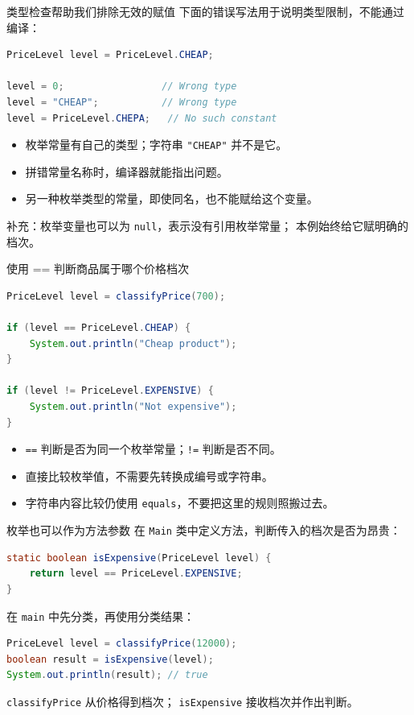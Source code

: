 \documentclass[aspectratio=169]{beamer}
\begin{document}
\begin{frame}[fragile]{类型检查帮助我们排除无效的赋值}
  下面的错误写法用于说明类型限制，\alert{不能通过编译}：
  \begin{lstlisting}[language=Java]
PriceLevel level = PriceLevel.CHEAP;

level = 0;                 // Wrong type
level = "CHEAP";           // Wrong type
level = PriceLevel.CHEPA;   // No such constant
  \end{lstlisting}
  \begin{itemize}
    \item 枚举常量有自己的类型；字符串 \texttt{"CHEAP"} 并不是它。
    \item 拼错常量名称时，编译器就能指出问题。
    \item 另一种枚举类型的常量，即使同名，也不能赋给这个变量。
  \end{itemize}
  \medskip
  补充：枚举变量也可以为 \texttt{null}，表示没有引用枚举常量；
  本例始终给它赋明确的档次。
\end{frame}

\begin{frame}[fragile]{使用 == 判断商品属于哪个价格档次}
  \begin{lstlisting}[language=Java]
PriceLevel level = classifyPrice(700);

if (level == PriceLevel.CHEAP) {
    System.out.println("Cheap product");
}

if (level != PriceLevel.EXPENSIVE) {
    System.out.println("Not expensive");
}
  \end{lstlisting}
  \begin{itemize}
    \item \texttt{==} 判断是否为同一个枚举常量；\texttt{!=} 判断是否不同。
    \item 直接比较枚举值，不需要先转换成编号或字符串。
    \item 字符串内容比较仍使用 \texttt{equals}，不要把这里的规则照搬过去。
  \end{itemize}
\end{frame}

\begin{frame}[fragile]{枚举也可以作为方法参数}
  在 \texttt{Main} 类中定义方法，判断传入的档次是否为昂贵：
  \begin{lstlisting}[language=Java]
static boolean isExpensive(PriceLevel level) {
    return level == PriceLevel.EXPENSIVE;
}
  \end{lstlisting}
  在 \texttt{main} 中先分类，再使用分类结果：
  \begin{lstlisting}[language=Java]
PriceLevel level = classifyPrice(12000);
boolean result = isExpensive(level);
System.out.println(result); // true
  \end{lstlisting}
  \medskip
  \texttt{classifyPrice} 从价格得到档次；
  \texttt{isExpensive} 接收档次并作出判断。
\end{frame}
\end{document}
